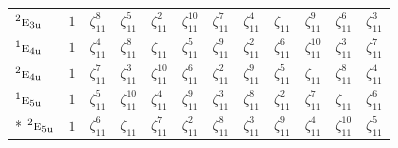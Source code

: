 \documentclass[10pt,a4paper]{article}
\numberwithin{equation}{section}
\newcommand{\irr}[1]{\text{\normalfont\scshape #1}}
\newcommand{\conjpair}[1]{{}^{#1}}
\newcommand{\ptag}[1]{\mathrm{#1}}
\newcommand{\rootunity}[1]{\zeta_{#1}}
\begin{document}
{\begin{longtable}{@{}lccccccccccc@{}}
$\conjpair{2}\irr{e}_{3\ptag{u}}$ & $1$ & $\rootunity{11}^{8}$ & $\rootunity{11}^{5}$ & $\rootunity{11}^{2}$ & $\rootunity{11}^{10}$ & $\rootunity{11}^{7}$ & $\rootunity{11}^{4}$ & $\rootunity{11}$ & $\rootunity{11}^{9}$ & $\rootunity{11}^{6}$ & $\rootunity{11}^{3}$\\
$\conjpair{1}\irr{e}_{4\ptag{u}}$ & $1$ & $\rootunity{11}^{4}$ & $\rootunity{11}^{8}$ & $\rootunity{11}$ & $\rootunity{11}^{5}$ & $\rootunity{11}^{9}$ & $\rootunity{11}^{2}$ & $\rootunity{11}^{6}$ & $\rootunity{11}^{10}$ & $\rootunity{11}^{3}$ & $\rootunity{11}^{7}$\\
$\conjpair{2}\irr{e}_{4\ptag{u}}$ & $1$ & $\rootunity{11}^{7}$ & $\rootunity{11}^{3}$ & $\rootunity{11}^{10}$ & $\rootunity{11}^{6}$ & $\rootunity{11}^{2}$ & $\rootunity{11}^{9}$ & $\rootunity{11}^{5}$ & $\rootunity{11}$ & $\rootunity{11}^{8}$ & $\rootunity{11}^{4}$\\
$\conjpair{1}\irr{e}_{5\ptag{u}}$ & $1$ & $\rootunity{11}^{5}$ & $\rootunity{11}^{10}$ & $\rootunity{11}^{4}$ & $\rootunity{11}^{9}$ & $\rootunity{11}^{3}$ & $\rootunity{11}^{8}$ & $\rootunity{11}^{2}$ & $\rootunity{11}^{7}$ & $\rootunity{11}$ & $\rootunity{11}^{6}$\\*
$\conjpair{2}\irr{e}_{5\ptag{u}}$ & $1$ & $\rootunity{11}^{6}$ & $\rootunity{11}$ & $\rootunity{11}^{7}$ & $\rootunity{11}^{2}$ & $\rootunity{11}^{8}$ & $\rootunity{11}^{3}$ & $\rootunity{11}^{9}$ & $\rootunity{11}^{4}$ & $\rootunity{11}^{10}$ & $\rootunity{11}^{5}$\\
\bottomrule\end{longtable}}
\end{document}
